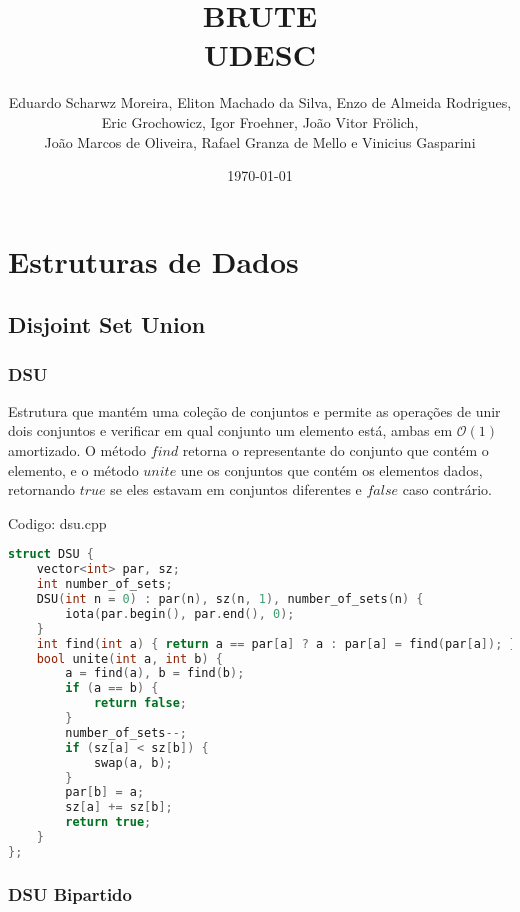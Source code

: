 \documentclass[10pt, a4paper, oneside]{book}
\title{BRUTE \\ UDESC}
\author{Eduardo Scharwz Moreira, Eliton Machado da Silva, Enzo de Almeida Rodrigues,\\
Eric Grochowicz, Igor Froehner, João Vitor Frölich,\\
João Marcos de Oliveira, Rafael Granza de Mello e Vinicius Gasparini}
\begin{document}
\twocolumn
\date{\today}
\maketitle

\renewcommand{\contentsname}{Índice} %

\tableofcontents
\newpage

%
%
%
%

\chapter{Estruturas de Dados}

\section{Disjoint Set Union}
\subsection{DSU}


Estrutura que mantém uma coleção de conjuntos e permite as operações de unir dois conjuntos e verificar em qual conjunto um elemento está, ambas em $\mathcal{O}(1)$ amortizado. O método $find$ retorna o representante do conjunto que contém o elemento, e o método $unite$ une os conjuntos que contém os elementos dados, retornando $true$ se eles estavam em conjuntos diferentes e $false$ caso contrário.

\hfill

Codigo: dsu.cpp

\begin{lstlisting}[language=C++]
struct DSU {
    vector<int> par, sz;
    int number_of_sets;
    DSU(int n = 0) : par(n), sz(n, 1), number_of_sets(n) {
        iota(par.begin(), par.end(), 0);
    }
    int find(int a) { return a == par[a] ? a : par[a] = find(par[a]); }
    bool unite(int a, int b) {
        a = find(a), b = find(b);
        if (a == b) {
            return false;
        }
        number_of_sets--;
        if (sz[a] < sz[b]) {
            swap(a, b);
        }
        par[b] = a;
        sz[a] += sz[b];
        return true;
    }
};
\end{lstlisting}
\hfill

\subsection{DSU Bipartido}
\end{document}
